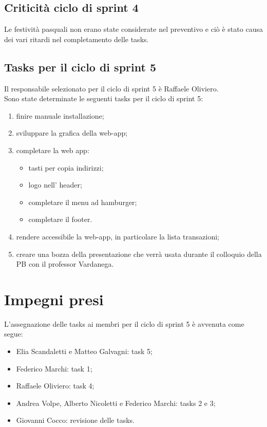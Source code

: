 \documentclass[a4paper, 12pt]{article}
\begin{document}
\subsection{Criticità ciclo di sprint 4}
Le festività pasquali non erano state considerate nel preventivo e ciò è stato causa dei vari ritardi nel completamento delle tasks.


\subsection{Tasks per il ciclo di sprint 5}
Il responsabile selezionato per il ciclo di sprint 5 è Raffaele Oliviero. \\
Sono state determinate le seguenti tasks per il ciclo di sprint 5:
\begin{enumerate}
	\item finire manuale installazione;
	\item sviluppare la grafica della web-app;
	\item completare la web app:
	    \begin{itemize}
	        \item tasti per copia indirizzi;
            \item logo nell' header;
            \item completare il menu ad hamburger;
            \item completare il footer.
	    \end{itemize}
	\item rendere accessibile la web-app, in particolare la lista transazioni;
	\item creare una bozza della presentazione che verrà usata durante il colloquio della PB con il professor Vardanega.
\end{enumerate}

\section{Impegni presi}
L'assegnazione delle tasks ai membri per il ciclo di sprint 5 è avvenuta come segue:
\begin{itemize}
	\item Elia Scandaletti e Matteo Galvagni: task 5;
	\item Federico Marchi: task 1;
	\item Raffaele Oliviero: task 4;
	\item Andrea Volpe, Alberto Nicoletti e Federico Marchi: tasks 2 e 3;
	\item Giovanni Cocco: revisione delle tasks.
\end{itemize}
\end{document}
